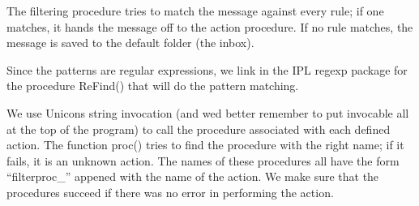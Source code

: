 The filtering procedure tries to match the message against every rule;
if one matches, it hands the message off to the action procedure. If no
rule matches, the message is saved to the default folder (the inbox).


Since the patterns are regular expressions, we link in the IPL regexp
package for the procedure \textsf{ReFind()} that will do the pattern
matching.


We use Unicon{\textquotesingle}s string invocation (and
we{\textquotesingle}d better remember to put \textsf{invocable all} at
the top of the program) to call the procedure associated with each
defined action. The function \textsf{proc()} tries to find the
procedure with the right name; if it fails, it is an unknown action.
The names of these procedures all have the form
{\textquotedblleft}filterproc\_{\textquotedblright} appened with the
name of the action. We make sure that the procedures succeed if there
was no error in performing the action.

